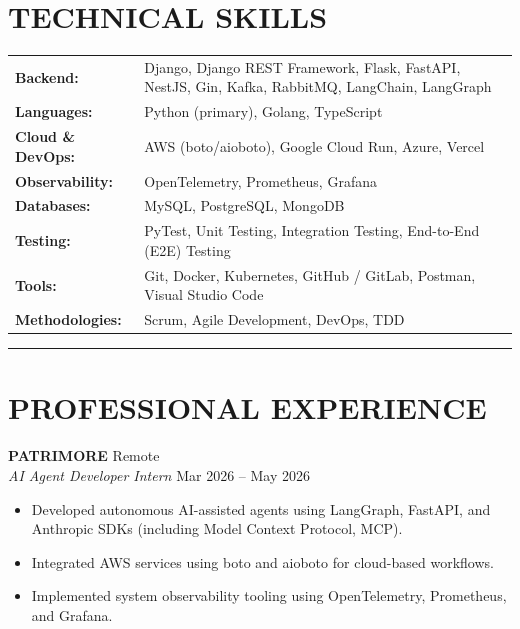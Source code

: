 \documentclass[11pt, a4paper]{article}
\begin{document}
\section*{TECHNICAL SKILLS}
\vspace{-2pt}
\begin{tabular}{p{} p{}}
\textbf{Backend:} & Django, Django REST Framework, Flask, FastAPI, NestJS, Gin, Kafka, RabbitMQ, LangChain, LangGraph \\
\textbf{Languages:} & Python (primary), Golang, TypeScript \\
\textbf{Cloud \& DevOps:} & AWS (boto/aioboto), Google Cloud Run, Azure, Vercel \\
\textbf{Observability:} & OpenTelemetry, Prometheus, Grafana \\
\textbf{Databases:} & MySQL, PostgreSQL, MongoDB \\
\textbf{Testing:} & PyTest, Unit Testing, Integration Testing, End-to-End (E2E) Testing \\
\textbf{Tools:} & Git, Docker, Kubernetes, GitHub / GitLab, Postman, Visual Studio Code \\
\textbf{Methodologies:} & Scrum, Agile Development, DevOps, TDD \\
\end{tabular}
\vspace{6pt}
\hrule
\vspace{8pt}

\section*{PROFESSIONAL EXPERIENCE}

\textbf{PATRIMORE} \hfill Remote \\
\textit{AI Agent Developer Intern} \hfill Mar 2026 -- May 2026

\begin{itemize}
\item Developed autonomous AI-assisted agents using LangGraph, FastAPI, and Anthropic SDKs (including Model Context Protocol, MCP).
\item Integrated AWS services using boto and aioboto for cloud-based workflows.
\item Implemented system observability tooling using OpenTelemetry, Prometheus, and Grafana.
\end{itemize}

\vspace{4pt}
\end{document}
